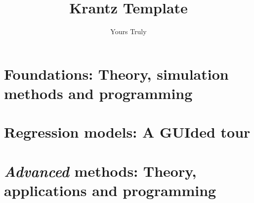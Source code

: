 \documentclass[krantz1]{krantz} %
\begin{document}
\frontmatter

\title{Krantz Template} %
\author{Yours Truly}





\locpage



\cleardoublepage
\setcounter{page}{7} %
\tableofcontents




\mainmatter

\part{Foundations: Theory, simulation methods and programming}





\part{Regression models: A GUIded tour}






\part{\textit{Advanced} methods: Theory, applications and programming}



%





%







\printindex
\end{document}
